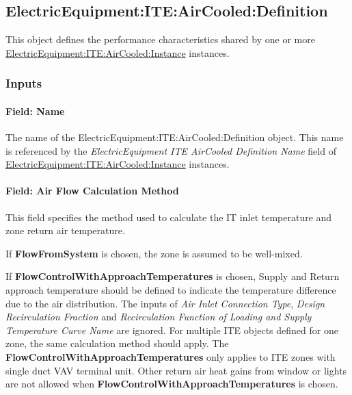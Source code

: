 \subsection{ElectricEquipment:ITE:AirCooled:Definition}\label{electricequipmentiteaircooleddefinition}

This object defines the performance characteristics shared by one or more \hyperref[electricequipmentiteaircooledinstance]{ElectricEquipment:ITE:AirCooled:Instance} instances.

\subsubsection{Inputs}\label{inputs-9-electricequipmentiteaircooleddefinition}

\paragraph{Field: Name}\label{field-name-electricequipmentiteaircooleddefinition}

The name of the ElectricEquipment:ITE:AirCooled:Definition object. This name is referenced by the \textit{ElectricEquipment ITE AirCooled Definition Name} field of \hyperref[electricequipmentiteaircooledinstance]{ElectricEquipment:ITE:AirCooled:Instance} instances.

\paragraph{Field: Air Flow Calculation Method}\label{field-air-flow-calculation-method-ite-definition}

This field specifies the method used to calculate the IT inlet temperature and zone return air temperature.

If \textbf{FlowFromSystem} is chosen, the zone is assumed to be well-mixed.

If \textbf{FlowControlWithApproachTemperatures} is chosen, Supply and Return approach temperature should be defined to indicate the temperature difference due to the air distribution. The inputs of \textit{Air Inlet Connection Type}, \textit{Design Recirculation Fraction} and \textit{Recirculation Function of Loading and Supply Temperature Curve Name} are ignored. For multiple ITE objects defined for one zone, the same calculation method should apply. The \textbf{FlowControlWithApproachTemperatures} only applies to ITE zones with single duct VAV terminal unit. Other return air heat gains from window or lights are not allowed when \textbf{FlowControlWithApproachTemperatures} is chosen.

